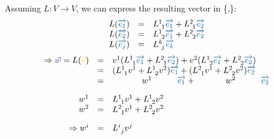 Assuming $L: V\rightarrow V$, we can express the resulting vector in
\{,\}:
\begin{equation}
    \label{eq:linear_map_derive_matrix_multiplication_2}
    \begin{array}{rcl}
        L(\hdbv{1}) & = & L^{1~}_{~1}\hdbv{1} + L^{2~}_{~1}\hdbv{2} \\
        L(\hdbv{2}) & = & L^{1~}_{~2}\hdbv{1} + L^{2~}_{~2}\hdbv{2} \\
        L(\hdbv{j}) & = & L^{k~}_{~j}\hdbv{k}
    \end{array}
\end{equation}
\begin{equation}
    \label{eq:linear_map_derive_matrix_multiplication_3}
    \begin{array}{rcl}
        \Rightarrow\textcolor{RoyalPurple}{\vec{w}} =
        L(\textcolor{Goldenrod}{\vec{v}}) & = &
        \hdvc{1}(L^{1~}_{~1}\hdbv{1} + L^{2~}_{~1}\hdbv{2}) +
        \hdvc{2}(L^{1~}_{~2}\hdbv{1} + L^{2~}_{~2}\hdbv{2}) \\
        & = & (L^{1~}_{~1}\hdvc{1}+ L^{1~}_{~2}\hdvc{2})\hdbv{1} +
        (L^{2~}_{~1}\hdvc{1} + L^{2~}_{~2}\hdvc{2})\hdbv{2} \\
        & = & \hspace{35pt}w^1\hspace{30pt}\hdbv{1} +
        \hspace{35pt}w^2\hspace{30pt}\hdbv{2} \\
        \noalign{\vskip10pt}
        w^1 & = & L^{1~}_{~1}\hdvc{1}+ L^{1~}_{~2}\hdvc{2} \\
        w^2 & = & L^{2~}_{~1}\hdvc{1} + L^{2~}_{~2}\hdvc{2} \\
        \noalign{\vskip10pt}
        \Rightarrow w^i & = &
        L^{i~}_{~j}\hdvc{j}
    \end{array}
\end{equation}


